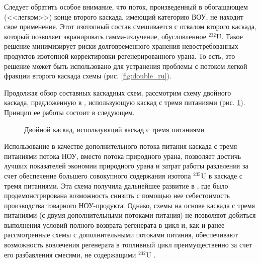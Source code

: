Следует обратить особое внимание, что поток, произведенный в обогащающем (<<легком>>) конце второго каскада, имеющий категорию ВОУ, не находит свое применение. Этот изотопный состав смешивается с отвалом второго каскада, который позволяет экранировать гамма-излучение, обусловленное $^{232}$U. Такое решение минимизирует риски долговременного хранения невостребованных продуктов изотопной корректировки регенерированного урана.
То есть, это решение может быть использовано для устранения проблемы с потоком легкой фракции второго каскада схемы (рис. \ref{fig:double_ru}).

Продолжая обзор составных каскадных схем, рассмотрим схему двойного каскада, предложенную в \cite{smirnovDilutionRecycledUranium2015}, использующую каскад с тремя питаниями (рис. \ref{fig:double_3feeds}). Принцип ее работы состоит в следующем.

\begin{figure}[ht]
  \caption{Двойной каскад, использующий каскад с тремя питаниями}\label{fig:double_3feeds}
\end{figure}

Использование в качестве дополнительного потока питания каскада с тремя питаниями потока НОУ, вместо потока природного урана, позволяет достичь лучших показателей экономии природного урана и затрат работы разделения за счет обеспечение большего совокупного содержания изотопа $^{235}$U в каскаде с тремя питаниями. Эта схема получила дальнейшее развитие в \cite{smirnovEvaluatingEffectivenessDilution2016}, где было продемонстрирована возможность снизить с помощью нее себестоимость производства товарного НОУ-продукта. Однако, схемы на основе каскада с тремя питаниями (с двумя дополнительными потоками питания) не позволяют добиться выполнения условий полного возврата регенерата в цикл и, как и ранее рассмотренные схемы с дополнительными потоками питания, обеспечивают возможность вовлечения регенерата в топливный цикл преимущественно за счет его разбавления смесями, не содержащими $^{232}$U \cite{smirnovApplyingEnrichmentCapacities2018}.

